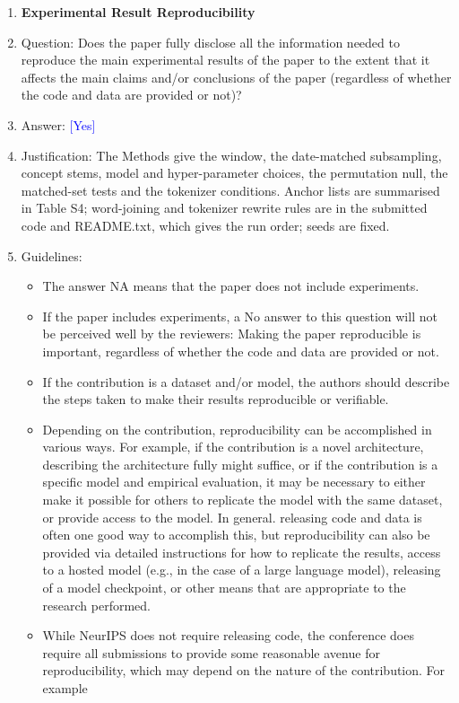 \documentclass[10pt,letterpaper]{article}
\newcommand{\answerYes}[1][]{\textcolor{blue}{[Yes] #1}}
\begin{document}
\begin{enumerate}
    \item {\bf Experimental Result Reproducibility}
    \item[] Question: Does the paper fully disclose all the information needed to reproduce the main experimental results of the paper to the extent that it affects the main claims and/or conclusions of the paper (regardless of whether the code and data are provided or not)?
    \item[] Answer: \answerYes{}
    \item[] Justification: The Methods give the window, the date-matched subsampling, concept stems, model and hyper-parameter choices, the permutation null, the matched-set tests and the tokenizer conditions. Anchor lists are summarised in Table S4; word-joining and tokenizer rewrite rules are in the submitted code and README.txt, which gives the run order; seeds are fixed.
    \item[] Guidelines:
    \begin{itemize}
        \item The answer NA means that the paper does not include experiments.
        \item If the paper includes experiments, a No answer to this question will not be perceived well by the reviewers: Making the paper reproducible is important, regardless of whether the code and data are provided or not.
        \item If the contribution is a dataset and/or model, the authors should describe the steps taken to make their results reproducible or verifiable. 
        \item Depending on the contribution, reproducibility can be accomplished in various ways. For example, if the contribution is a novel architecture, describing the architecture fully might suffice, or if the contribution is a specific model and empirical evaluation, it may be necessary to either make it possible for others to replicate the model with the same dataset, or provide access to the model. In general. releasing code and data is often one good way to accomplish this, but reproducibility can also be provided via detailed instructions for how to replicate the results, access to a hosted model (e.g., in the case of a large language model), releasing of a model checkpoint, or other means that are appropriate to the research performed.
        \item While NeurIPS does not require releasing code, the conference does require all submissions to provide some reasonable avenue for reproducibility, which may depend on the nature of the contribution. For example

\end{itemize}
\end{enumerate}
\end{document}
